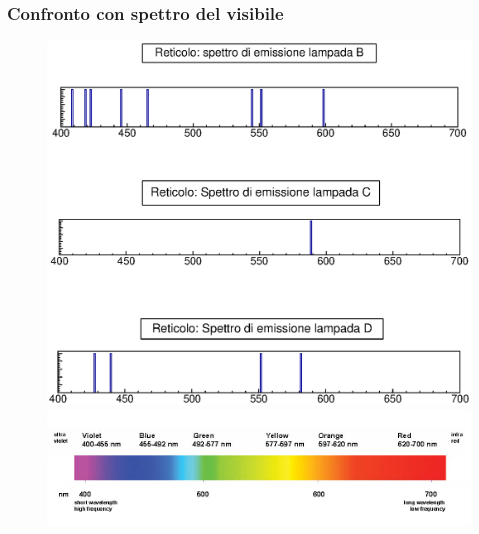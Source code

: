 \subsubsection{Confronto con spettro del visibile}
\label{sec:reticolo_confronto} 
%
%
    \begin{figure}[H]
    \centering
    \includegraphics[scale=0.75]{Grafici/O3_P1_2_spectrum.eps}
%
    \includegraphics[scale=1.1]{Grafici/VISspectrum.jpg}
    \label{fig:C3_P2_RL}
    \end{figure} 
%